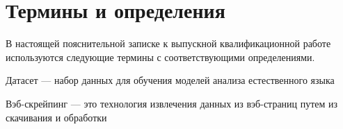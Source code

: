 \documentclass[../main]{subfiles}
\begin{document}
\newpage
{}
\section*{Термины и определения}

В настоящей пояснительной записке к выпускной квалификационной
работе используются следующие термины с соответствующими
определениями.

\begin{termenum}
    \item Датасет --- набор данных для обучения моделей анализа естественного языка
    \item Вэб-скрейпинг --- это технология извлечения данных из вэб-страниц путем из скачивания и обработки
\end{termenum}
\end{document}
